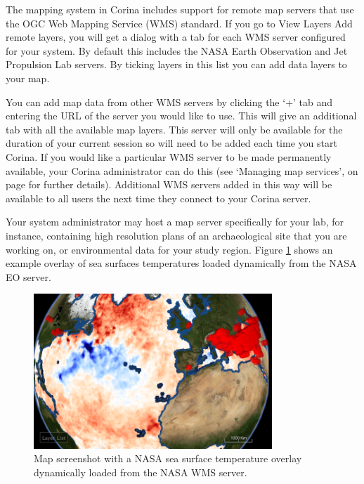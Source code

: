 The mapping system in Corina includes support for remote map servers that use the OGC Web Mapping Service (WMS) standard. If you go to View \MVRightarrow Layers \MVRightarrow Add remote layers, you will get a dialog with a tab for each WMS server configured for your system. By default this includes the NASA Earth Observation and Jet Propulsion Lab servers.  By ticking layers in this list you can add data layers to your map.

You can add map data from other WMS servers by clicking the `+' tab and entering the URL of the server you would like to use.  This will give an additional tab with all the available map layers.  This server will only be available for the duration of your current session so will need to be added each time you start Corina.  If you would like a particular WMS server to be made permanently available, your Corina administrator can do this (see `Managing map services', on page \pageref{txt:managingmaps} for further details).  Additional WMS servers added in this way will be available to all users the next time they connect to your Corina server.

Your system administrator may host a map server specifically for your lab, for instance, containing high resolution plans of an archaeological site that you are working on, or environmental data for your study region. Figure \ref{fig:wms} shows an example overlay of sea surfaces temperatures loaded dynamically from the NASA EO server.

\begin{figure}[hbtp]
  \label{fig:wms}
  \centering
    \includegraphics[width=0.8\textwidth]{Images/sst.png}
    \caption{Map screenshot with a NASA sea surface temperature overlay dynamically loaded from the NASA WMS server.}
\end{figure}




